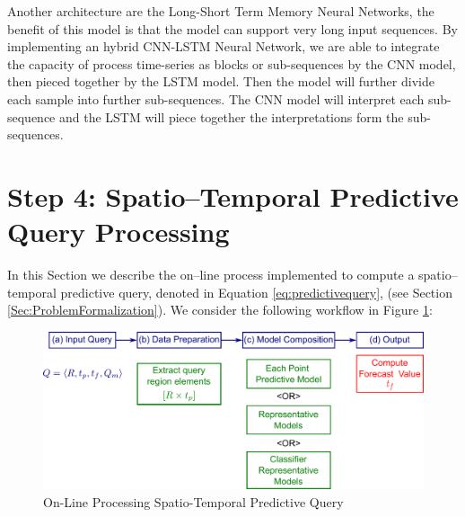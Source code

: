 Another architecture are the Long-Short Term Memory Neural Networks, the benefit of this model is that the model can support very long input sequences. By implementing an hybrid CNN-LSTM Neural Network, we are able to integrate the capacity of process time-series as blocks or sub-sequences by the CNN model, then pieced together by the LSTM model. Then the model will further divide each sample into further sub-sequences. The CNN model will interpret each sub-sequence and the LSTM will piece together the interpretations form the sub-sequences. 

\section{Step 4: Spatio--Temporal Predictive Query Processing}
\label{Sec:SpatioTemporalQueryProcessing}	

In this Section we describe the on--line process implemented to compute a spatio--temporal predictive query, denoted in Equation \ref{eq:predictivequery}, (see Section \ref{Sec:ProblemFormalization}). We consider the following workflow in Figure \ref{Fig:OnLineQP}: 

\begin{figure}[h]
	\centering
	\includegraphics[scale=0.35]{../Figures/Query_Processing}
	\caption{On-Line Processing Spatio-Temporal Predictive Query}
	\label{Fig:OnLineQP}
\end{figure}

